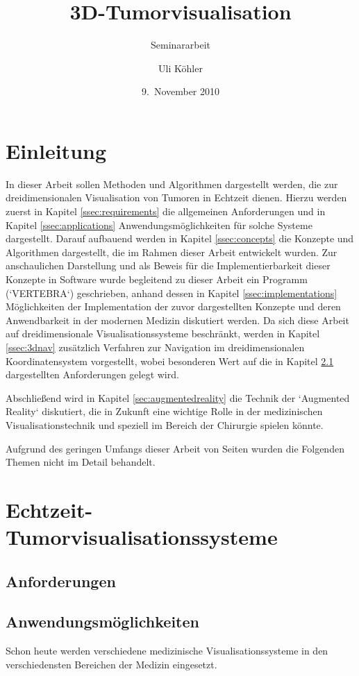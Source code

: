 \documentclass[a4paper]{scrartcl}
\title{3D-Tumorvisualisation}
\subtitle{Seminararbeit}
\author{Uli Köhler}
\date{9.~November 2010}
\begin{document}
\maketitle
\tableofcontents \newpage
\section{Einleitung}\label{sec:introduction}
In dieser Arbeit sollen Methoden und Algorithmen dargestellt werden, die zur dreidimensionalen Visualisation von Tumoren in Echtzeit dienen. Hierzu werden zuerst in Kapitel \vref{ssec:requirements} die allgemeinen Anforderungen und in Kapitel \vref{ssec:applications}
Anwendungsmöglichkeiten für solche Systeme dargestellt. Darauf aufbauend werden in Kapitel \vref{ssec:concepts} die Konzepte und Algorithmen dargestellt, die im Rahmen dieser Arbeit entwickelt wurden. Zur anschaulichen Darstellung und als Beweis für die Implementierbarkeit dieser Konzepte in Software wurde begleitend zu dieser Arbeit ein Programm (`VERTEBRA`) geschrieben, anhand dessen in Kapitel \vref{ssec:implementations} Möglichkeiten der Implementation der zuvor dargestellten Konzepte und deren Anwendbarkeit in der modernen Medizin diskutiert werden. Da sich diese Arbeit auf dreidimensionale Visualisationssysteme beschränkt, werden in Kapitel \vref{ssec:3dnav} zusätzlich Verfahren zur Navigation im dreidimensionalen Koordinatensystem vorgestellt, wobei besonderen Wert auf die in Kapitel \ref{ssec:requirements} dargestellten Anforderungen gelegt wird.

Abschließend wird in Kapitel \vref{sec:augmentedreality} die Technik der `Augmented Reality` diskutiert, die in Zukunft eine wichtige Rolle in der medizinischen Visualisationstechnik und speziell im Bereich der Chirurgie spielen könnte.

Aufgrund des geringen Umfangs dieser Arbeit von \pageref{appendixstart} Seiten wurden die Folgenden Themen nicht im Detail behandelt.
\section{Echtzeit-Tumorvisualisationssysteme}\label{sec:vissystems}
\subsection{Anforderungen}\label{ssec:requirements}
\subsection{Anwendungsmöglichkeiten}\label{ssec:applications}
Schon heute werden verschiedene medizinische Visualisationssysteme in den verschiedensten Bereichen der Medizin eingesetzt. 
\end{document}
